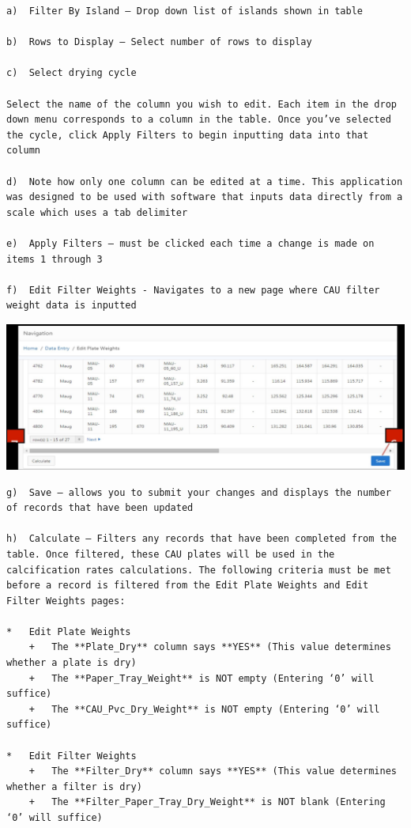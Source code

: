 \documentclass[]{book}
\begin{document}
\begin{verbatim}
a)  Filter By Island – Drop down list of islands shown in table  

b)  Rows to Display – Select number of rows to display  

c)  Select drying cycle  

Select the name of the column you wish to edit. Each item in the drop down menu corresponds to a column in the table. Once you’ve selected the cycle, click Apply Filters to begin inputting data into that column  

d)  Note how only one column can be edited at a time. This application was designed to be used with software that inputs data directly from a scale which uses a tab delimiter  

e)  Apply Filters – must be clicked each time a change is made on items 1 through 3  

f)  Edit Filter Weights - Navigates to a new page where CAU filter weight data is inputted  
\end{verbatim}

\includegraphics{images/Data4.jpg}

\begin{verbatim}
g)  Save – allows you to submit your changes and displays the number of records that have been updated  

h)  Calculate – Filters any records that have been completed from the table. Once filtered, these CAU plates will be used in the calcification rates calculations. The following criteria must be met before a record is filtered from the Edit Plate Weights and Edit Filter Weights pages:  

*   Edit Plate Weights  
    +   The **Plate_Dry** column says **YES** (This value determines whether a plate is dry)  
    +   The **Paper_Tray_Weight** is NOT empty (Entering ‘0’ will suffice)  
    +   The **CAU_Pvc_Dry_Weight** is NOT empty (Entering ‘0’ will suffice)  

*   Edit Filter Weights  
    +   The **Filter_Dry** column says **YES** (This value determines whether a filter is dry)  
    +   The **Filter_Paper_Tray_Dry_Weight** is NOT blank (Entering ‘0’ will suffice)  
\end{verbatim}
\end{document}
